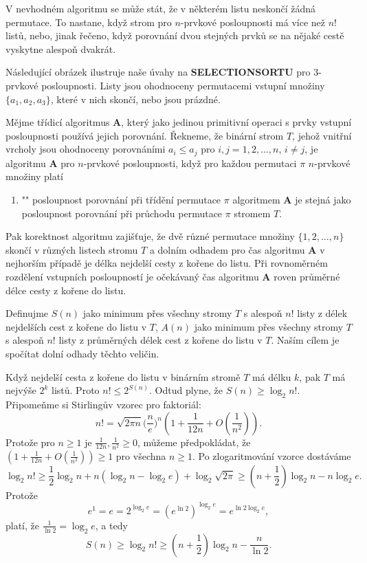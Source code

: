 \documentclass[a4paper,12pt]{article}
\def \emph#1{\underbar{#1}}
\begin{document}
V nevhodném algoritmu se může stát, že 
v některém listu neskončí žádná permutace. To  
nastane, když strom pro $n$-prvkové posloupnosti má více 
než $n!$ listů, nebo, jinak řečeno, když 
porovnání dvou stejných prvků se na nějaké cestě 
vyskytne alespoň dvakrát. 

Následující obrázek ilustruje naše úvahy na 
{\bf SELECTIONSORTU} pro $3$-prvkové posloupnosti. Listy jsou 
ohodnoceny permutacemi vstupní množiny 
$\{a_1,a_2,a_3\}$, které v nich 
skončí, nebo jsou prázdné. 
\midinsert
\centerline{}
\endcaption
\endinsert

Mějme třídicí algoritmus {\bf A}, který 
jako jedinou pri\-mitivní operaci s prvky vstupní 
posloupnosti používá jejich porov\-nání. \v Rekneme, že binární 
strom $T$, jehož vnitřní vrcholy jsou ohodnoceny 
porovnáními  $a_i\le a_j$ pro $i,j=1,2,\dots,n$, $i\ne j$, je 
\emph{rozhodovacím} \emph{stromem} algoritmu {\bf A} pro 
$n$-prvkové posloupnosti, když pro každou permutaci $\pi$
$n$-prvkové množiny platí 
\begin{enumerate}
\item"{}"
posloupnost porovnání při třídění permutace $
\pi$ 
algoritmem {\bf A} je stejná jako po\-sloupnost porovnání při 
průchodu permutace $\pi$ stromem $T$.
\end{enumerate}
\enddefinition

Pak korektnost algoritmu zajišťuje, že dvě různé 
permutace množiny $\{1,2,\dots,n\}$ skončí v 
různých listech stromu $T$ a dol\-ním odhadem pro 
čas algoritmu {\bf A} v nej\-horším případě je délka nejdelší 
cesty z kořene do listu.  
Při rovnoměrném 
rozdělení vstupních po\-sloupností je očekávaný čas 
algoritmu {\bf A} roven průměrné délce cesty z kořene do 
listu.  

Definujme\newline 
$S(n)$ jako minimum přes všechny stromy $T$ s alespoň $n
!$ listy z 
délek nejdelších cest z kořene 
do listu v $T$, \newline 
$A(n)$ jako minimum přes všechny stromy $T$ s alespoň $n
!$ listy z
průměrných délek cest z kořene do listu v $T$.\newline 
Naším cílem je spočítat dolní odhady těchto veličin.

Když nejdelší cesta z kořene do listu v 
binárním stromě $T$ má délku $k$, pak $T$ má nejvýše $
2^k$ 
listů. Proto $n!\le 2^{S(n)}$. Odtud plyne, že $S(n)\ge\log_
2n!$.
Připomeňme si Stirlingův vzorec pro faktoriál: 
$$n!=\sqrt {2\pi n}\big(\frac ne\big)^n(1+\frac 1{12n}+O(\frac 1{
n^2})).$$
Protože pro $n\ge 1$ je $\frac 1{12n},\frac 1{n^2}\ge 0$, můžeme 
předpokládat, že $(1+\frac 1{12n}+O(\frac 1{n^2}))\ge 1$ pro všechna $
n\ge 1$. Po 
zlogaritmování vzorce dostáváme 
$$\log_2n!\ge\frac 12\log_2n+n(\log_2n-\log_2e)+\log_2\sqrt {2\pi}
\ge (n+\frac 12)\log_2n-n\log_2e.$$
Protože  
$$e^1=e=2^{\log_2e}=(e^{\ln2})^{\log_2e}=e^{\ln2\log_2e},$$
platí, že $\frac 1{\ln2}=\log_2e$, a tedy  
$$S(n)\ge\log_2n!\ge (n+\frac 12)\log_2n-\frac n{\ln2}.$$
\end{document}
